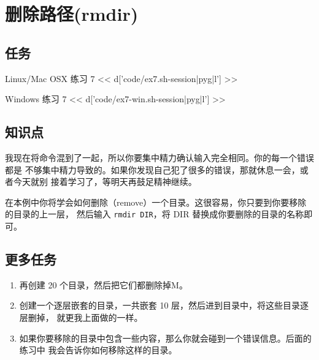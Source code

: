 \chapter{删除路径(rmdir)}

\section{任务}

\begin{code}{Linux/Mac OSX 练习 7}
<< d['code/ex7.sh-session|pyg|l'] >>
\end{code}

\begin{code}{Windows 练习 7}
<< d['code/ex7-win.sh-session|pyg|l'] >>
\end{code}


\section{知识点}

我现在将命令混到了一起，所以你要集中精力确认输入完全相同。你的每一个错误都是
不够集中精力导致的。如果你发现自己犯了很多的错误，那就休息一会，或者今天就别
接着学习了，等明天再鼓足精神继续。

在本例中你将学会如何删除（remove）一个目录。这很容易，你只要到你要移除的目录的上一层，
然后输入 \verb|rmdir DIR|，将 DIR 替换成你要删除的目录的名称即可。

\section{更多任务}

\begin{enumerate}
\item 再创建 20 个目录，然后把它们都删除掉M。
\item 创建一个逐层嵌套的目录，一共嵌套 10 层，然后进到目录中，将这些目录逐层删掉，
    就更我上面做的一样。
\item 如果你要移除的目录中包含一些内容，那么你就会碰到一个错误信息。后面的练习中
    我会告诉你如何移除这样的目录。
\end{enumerate}

